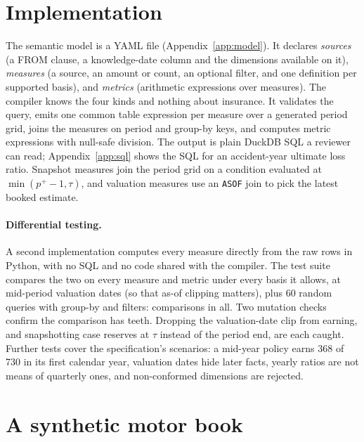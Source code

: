 \documentclass[11pt]{article}
\begin{document}
\section{Implementation}\label{sec:impl}

The semantic model is a YAML file (Appendix~\ref{app:model}). It declares \emph{sources} (a FROM clause, a
knowledge-date column and the dimensions available on it), \emph{measures} (a source, an amount or count, an
optional filter, and one definition per supported basis), and \emph{metrics} (arithmetic expressions over
measures). The compiler knows the four kinds and nothing about insurance. It validates the query, emits one
common table expression per measure over a generated period grid, joins the measures on period and group-by
keys, and computes metric expressions with null-safe division. The output is plain DuckDB SQL a reviewer can
read; Appendix~\ref{app:sql} shows the SQL for an accident-year ultimate loss ratio. Snapshot measures join the
period grid on a condition evaluated at $\min(p^+ - 1, \tau)$, and valuation measures use an \texttt{ASOF} join
to pick the latest booked estimate.

\paragraph{Differential testing.}
A second implementation computes every measure directly from the raw rows in Python, with no SQL and no code
shared with the compiler. The test suite compares the two on every measure and metric under every basis it
allows, at mid-period valuation dates (so that as-of clipping matters), plus 60 random queries with group-by and
filters: \CrossChecks{} comparisons in all. Two mutation checks confirm the comparison has teeth. Dropping the
valuation-date clip from earning, and snapshotting case reserves at $\tau$ instead of the period end, are each
caught. Further tests cover the specification's scenarios: a mid-year policy earns 368 of 730 in its first
calendar year, valuation dates hide later facts, yearly ratios are not means of quarterly ones, and
non-conformed dimensions are rejected.

\section{A synthetic motor book}\label{sec:book}
\end{document}

